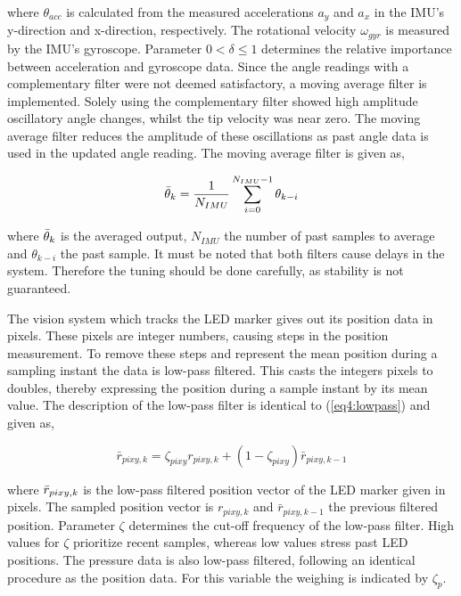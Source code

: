 where $\theta_{acc}$ is calculated from the measured accelerations $a_y$ and $a_x$ in the IMU's y-direction and x-direction, respectively. The rotational velocity $\omega_{gyr}$ is measured by the IMU's gyroscope. Parameter $0 < \delta \leq 1$ determines the relative importance between acceleration and gyroscope data. Since the angle readings with a complementary filter were not deemed satisfactory, a moving average filter is implemented. Solely using the complementary filter showed high amplitude oscillatory angle changes, whilst the tip velocity was near zero. The moving average filter reduces the amplitude of these oscillations as past angle data is used in the updated angle reading. The moving average filter is given as,

\begin{equation}
    \Bar{\theta}_k = \frac{1}{N_{IMU}}\sum_{i = 0} ^ {N_{IMU}-1} \theta_{k-i}
\end{equation}

where $\Bar{\theta}_k$ is the averaged output, $N_{IMU}$ the number of past samples to average and $\theta_{k-i}$ the past sample. It must be noted that both filters cause delays in the system. Therefore the tuning should be done carefully, as stability is not guaranteed.

The vision system which tracks the LED marker gives out its position data in pixels. These pixels are integer numbers, causing steps in the position measurement. To remove these steps and represent the mean position during a sampling instant the data is low-pass filtered. This casts the integers pixels to doubles, thereby expressing the position during a sample instant by its mean value. The description of the low-pass filter is identical to (\ref{eq4:lowpass}) and given as,

\begin{equation}
\bar{r}_{pixy,k} = \zeta_{pixy} r_{pixy,k} + (1-\zeta_{pixy})\bar{r}_{pixy,k-1}
\label{eq5:lowpass}
\end{equation}

where $\Bar{r}_{pixy,k}$ is the low-pass filtered position vector of the LED marker given in pixels. The sampled position vector is $r_{pixy,k}$ and $\bar{r}_{pixy,k-1}$ the previous filtered position. Parameter $\zeta$ determines the cut-off frequency of the low-pass filter. High values for $\zeta$ prioritize recent samples, whereas low values stress past LED positions. The pressure data is also low-pass filtered, following an identical procedure as the position data. For this variable the weighing is indicated by $\zeta_p$. 





